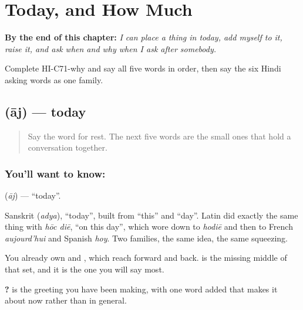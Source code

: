 
\chapter{Today, and How Much}
\label{ch:hi-today-and-how-much}

\begin{chapteropening}
\textbf{By the end of this chapter:} \emph{I can place a thing in today, add myself to it, raise it, and ask when and why when I ask after somebody.}

Complete HI-C71-why and say all five words in order, then say the six Hindi asking words as one family.
\end{chapteropening}

\section[āj]{ (āj) — today}

\label{lesson:HI-C71-today}



\begin{quote}
Say the word for rest. The next five words are the small ones that hold a conversation together.
\end{quote}

\subsection*{You'll want to know: }
\textbf{} (\emph{āj}) — \textquotedblleft{}today\textquotedblright{}.

Sanskrit  (\emph{adya}), \textquotedblleft{}today\textquotedblright{}, built from \textquotedblleft{}this\textquotedblright{} and \textquotedblleft{}day\textquotedblright{}. Latin did exactly the same thing with \emph{hōc diē}, \textquotedblleft{}on this day\textquotedblright{}, which wore down to \emph{hodiē} and then to French \emph{aujourd'hui} and Spanish \emph{hoy}. Two families, the same idea, the same squeezing.

You already own \textbf{} and \textbf{}, which reach forward and back.  is the missing middle of that set, and it is the one you will say most.

\textbf{   ?} is the greeting you have been making, with one word added that makes it about now rather than in general.

